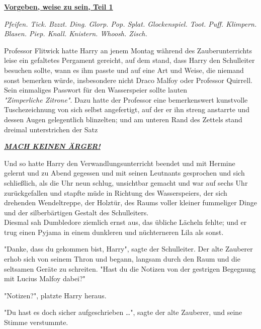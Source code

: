 

\hypertarget{vorgeben-weise-zu-sein-teil-1}{%

\textbf{\uline{Vorgeben, weise zu sein, Teil 1\\ }}

\emph{Pfeifen. Tick. Bzzzt. Ding. Glorp. Pop. Splat. Glockenspiel. Toot. Puff. Klimpern. Blasen. Piep. Knall. Knistern. Whoosh. Zisch.}

Professor Flitwick hatte Harry an jenem Montag während des Zauberunterrichts leise ein gefaltetes Pergament gereicht, auf dem stand, dass Harry den Schulleiter besuchen sollte, wann es ihm passte und auf eine Art und Weise, die niemand sonst bemerken würde, insbesondere nicht Draco Malfoy oder Professor Quirrell. Sein einmaliges Passwort für den Wasserspeier sollte lauten\\ \emph{"Zimperliche Zitrone"}. Dazu hatte der Professor eine bemerkenswert kunstvolle Tuschezeichnung von sich selbst angefertigt, auf der er ihn streng anstarrte und dessen Augen gelegentlich blinzelten; und am unteren Rand des Zettels stand dreimal unterstrichen der Satz

\textbf{\emph{\uline{MACH KEINEN ÄRGER!}}}

Und so hatte Harry den Verwandlungsunterricht beendet und mit Hermine gelernt und zu Abend gegessen und mit seinen Leutnants gesprochen und sich schließlich, als die Uhr neun schlug, unsichtbar gemacht und war auf sechs Uhr zurückgefallen und stapfte müde in Richtung des Wasserspeiers, der sich drehenden Wendeltreppe, der Holztür, des Raums voller kleiner fummeliger Dinge und der silberbärtigen Gestalt des Schulleiters.\\ Diesmal sah Dumbledore ziemlich ernst aus, das übliche Lächeln fehlte; und er trug einen Pyjama in einem dunkleren und nüchterneren Lila als sonst.

"Danke, dass du gekommen bist, Harry", sagte der Schulleiter. Der alte Zauberer erhob sich von seinem Thron und begann, langsam durch den Raum und die seltsamen Geräte zu schreiten. "Hast du die Notizen von der gestrigen Begegnung mit Lucius Malfoy dabei?"

"Notizen?", platzte Harry heraus.

"Du hast es doch sicher aufgeschrieben …", sagte der alte Zauberer, und seine Stimme verstummte.

}
